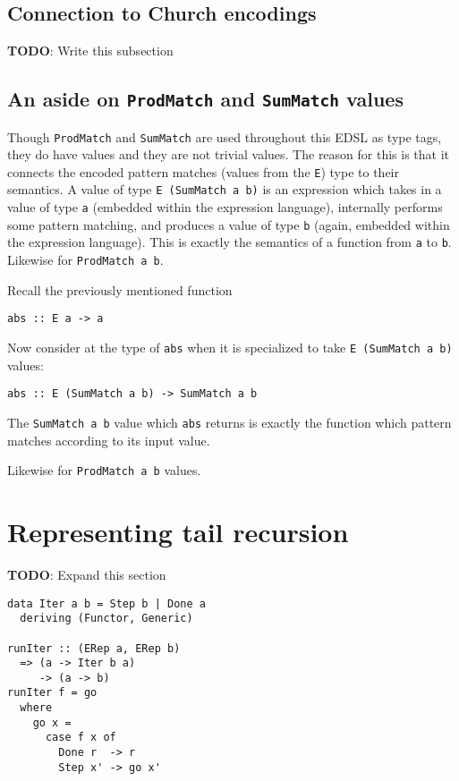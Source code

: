 \documentclass[sigplan,screen]{acmart}
\newcommand{\ttt}{\texttt}
\begin{document}
\subsection{Connection to Church encodings}
\begin{tcolorbox}
  \textbf{TODO}: Write this subsection
\end{tcolorbox}

\subsection{An aside on \ttt{ProdMatch} and \ttt{SumMatch} values}

Though \ttt{ProdMatch} and \ttt{SumMatch} are used throughout this EDSL as type
tags, they do have values and they are not trivial values. The reason for this
is that it connects the encoded pattern matches (values from the \ttt{E}) type
to their semantics. A value of type \ttt{E (SumMatch a b)} is an expression
which takes in a value of type \ttt{a} (embedded within the expression
language), internally performs some pattern matching, and produces a value of
type \ttt{b} (again, embedded within the expression language). This is exactly
the semantics of a function from \ttt{a} to \ttt{b}. Likewise for \ttt{ProdMatch a b}.

Recall the previously mentioned function

\begin{lstlisting}
abs :: E a -> a
\end{lstlisting}

Now consider at the type of \ttt{abs} when it is specialized to take
\ttt{E (SumMatch a b)} values:

\begin{lstlisting}
abs :: E (SumMatch a b) -> SumMatch a b
\end{lstlisting}

The \ttt{SumMatch a b} value which \ttt{abs} returns is exactly the function
which pattern matches according to its input value.

Likewise for \ttt{ProdMatch a b} values.

\section{Representing tail recursion}
\begin{tcolorbox}
  \textbf{TODO}: Expand this section
\end{tcolorbox}

\begin{lstlisting}
data Iter a b = Step b | Done a
  deriving (Functor, Generic)

runIter :: (ERep a, ERep b)
  => (a -> Iter b a)
     -> (a -> b)
runIter f = go
  where
    go x =
      case f x of
        Done r  -> r
        Step x' -> go x'
\end{lstlisting}
\end{document}

